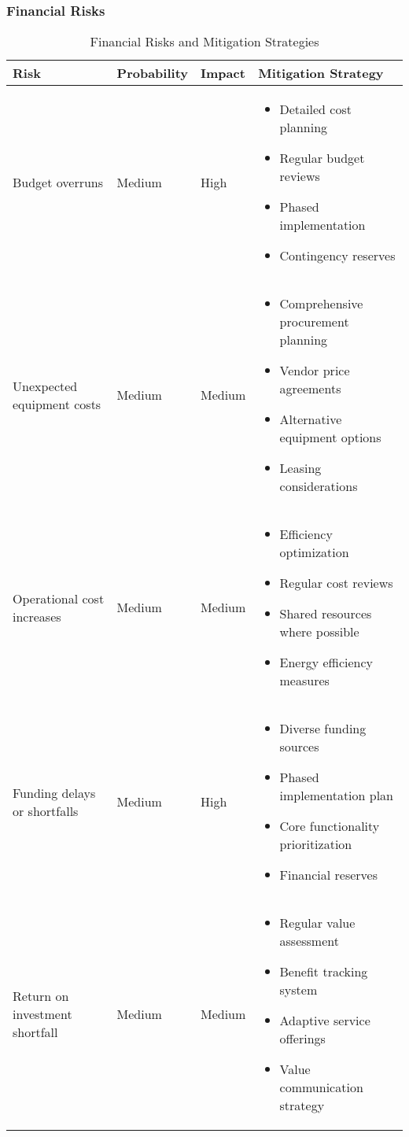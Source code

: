 \subsubsection{Financial Risks}
\begin{table}[H]
\centering
\begin{tabular}{|p{3cm}|p{2cm}|p{2cm}|p{7cm}|}
\hline
\textbf{Risk} & \textbf{Probability} & \textbf{Impact} & \textbf{Mitigation Strategy} \\
\hline
Budget overruns & Medium & High & 
\begin{itemize}
    \item Detailed cost planning
    \item Regular budget reviews
    \item Phased implementation
    \item Contingency reserves
\end{itemize} \\
\hline
Unexpected equipment costs & Medium & Medium & 
\begin{itemize}
    \item Comprehensive procurement planning
    \item Vendor price agreements
    \item Alternative equipment options
    \item Leasing considerations
\end{itemize} \\
\hline
Operational cost increases & Medium & Medium & 
\begin{itemize}
    \item Efficiency optimization
    \item Regular cost reviews
    \item Shared resources where possible
    \item Energy efficiency measures
\end{itemize} \\
\hline
Funding delays or shortfalls & Medium & High & 
\begin{itemize}
    \item Diverse funding sources
    \item Phased implementation plan
    \item Core functionality prioritization
    \item Financial reserves
\end{itemize} \\
\hline
Return on investment shortfall & Medium & Medium & 
\begin{itemize}
    \item Regular value assessment
    \item Benefit tracking system
    \item Adaptive service offerings
    \item Value communication strategy
\end{itemize} \\
\hline
\end{tabular}
\caption{Financial Risks and Mitigation Strategies}
\end{table}

